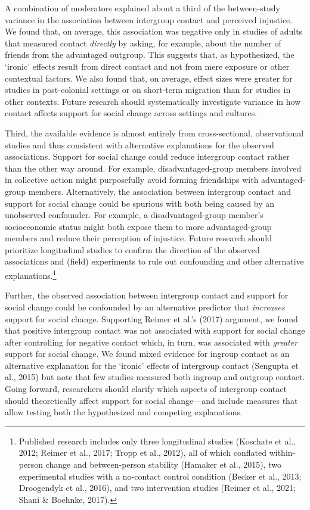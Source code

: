 \documentclass[twocolumn, 11pt, letterpaper]{article}
\begin{document}
A combination of moderators explained about a third of the between-study
variance in the association between intergroup contact and perceived
injustice. We found that, on average, this association was negative only
in studies of adults that measured contact \emph{directly} by asking,
for example, about the number of friends from the advantaged outgroup.
This suggests that, as hypothesized, the `ironic' effects result from
direct contact and not from mere exposure or other contextual factors.
We also found that, on average, effect sizes were greater for studies in
post-colonial settings or on short-term migration than for studies in
other contexts. Future research should systematically investigate
variance in how contact affects support for social change across
settings and cultures.

Third, the available evidence is almost entirely from cross-sectional,
observational studies and thus consistent with alternative explanations
for the observed associations. Support for social change could reduce
intergroup contact rather than the other way around. For example,
disadvantaged-group members involved in collective action might
purposefully avoid forming friendships with advantaged-group members.
Alternatively, the association between intergroup contact and support
for social change could be spurious with both being caused by an
unobserved confounder. For example, a disadvantaged-group member's
socioeconomic status might both expose them to more advantaged-group
members and reduce their perception of injustice. Future research should
prioritize longitudinal studies to confirm the direction of the observed
associations and (field) experiments to rule out confounding and other
alternative explanations.\footnote{Published research includes only
  three longitudinal studies (Koschate et al., 2012; Reimer et al.,
  2017; Tropp et al., 2012), all of which conflated within-person change
  and between-person stability (Hamaker et al., 2015), two experimental
  studies with a no-contact control condition (Becker et al., 2013;
  Droogendyk et al., 2016), and two intervention studies (Reimer et al.,
  2021; Shani \& Boehnke, 2017).}

Further, the observed association between intergroup contact and support
for social change could be confounded by an alternative predictor that
\emph{increases} support for social change. Supporting Reimer et al.'s
(2017) argument, we found that positive intergroup contact was not
associated with support for social change after controlling for negative
contact which, in turn, was associated with \emph{greater} support for
social change. We found mixed evidence for ingroup contact as an
alternative explanation for the `ironic' effects of intergroup contact
(Sengupta et al., 2015) but note that few studies measured both ingroup
and outgroup contact. Going forward, researchers should clarify which
aspects of intergroup contact should theoretically affect support for
social change---and include measures that allow testing both the
hypothesized and competing explanations.
\end{document}
